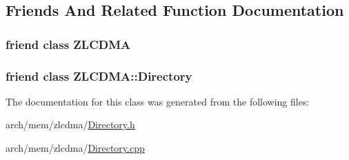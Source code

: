 \subsection{Friends And Related Function Documentation}
\hypertarget{class_simulator_1_1_z_l_c_d_m_a_1_1_directory_bottom_a1c09861c9a70825235b5f80518d478a1}{
\subsubsection[{Z\+L\+C\+D\+M\+A}]{\setlength{\rightskip}{0pt plus 5cm}friend class {\bf Z\+L\+C\+D\+M\+A}\hspace{0.3cm}{\ttfamily [friend]}}}\label{class_simulator_1_1_z_l_c_d_m_a_1_1_directory_bottom_a1c09861c9a70825235b5f80518d478a1}
\hypertarget{class_simulator_1_1_z_l_c_d_m_a_1_1_directory_bottom_a1c8d2b869e248d4ee4a7b637c7252d62}{
\subsubsection[{Z\+L\+C\+D\+M\+A\+::\+Directory}]{\setlength{\rightskip}{0pt plus 5cm}friend class {\bf Z\+L\+C\+D\+M\+A\+::\+Directory}\hspace{0.3cm}{\ttfamily [friend]}}}\label{class_simulator_1_1_z_l_c_d_m_a_1_1_directory_bottom_a1c8d2b869e248d4ee4a7b637c7252d62}


The documentation for this class was generated from the following files\+:\begin{DoxyCompactItemize}
\item 
arch/mem/zlcdma/\hyperlink{zlcdma_2_directory_8h}{Directory.\+h}\item 
arch/mem/zlcdma/\hyperlink{zlcdma_2_directory_8cpp}{Directory.\+cpp}\end{DoxyCompactItemize}
